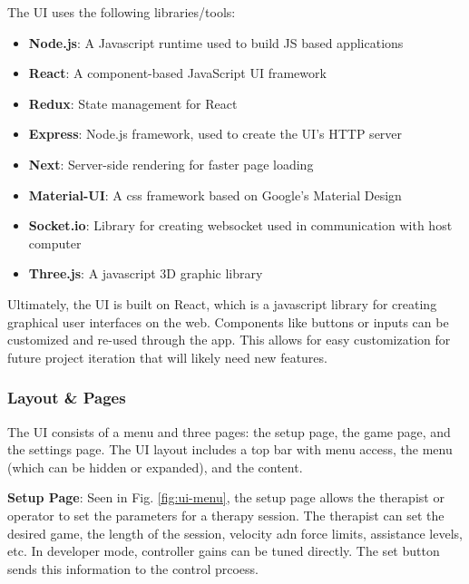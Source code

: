 \documentclass[12pt]{report}
\begin{document}
	The UI uses the following libraries/tools:
	
	\begin{itemize}
		\item \textbf{Node.js}: A Javascript runtime used to build JS based applications 		
		\item \textbf{React}: A component-based JavaScript UI framework
		\item \textbf{Redux}: State management for React
		\item \textbf{Express}: Node.js framework, used to create the UI's HTTP server
		\item \textbf{Next}: Server-side rendering for faster page loading
		\item \textbf{Material-UI}: A css framework based on Google's Material Design
		\item \textbf{Socket.io}: Library for creating websocket used in communication with host computer
		\item \textbf{Three.js}: A javascript 3D graphic library 
	\end{itemize}
	
	
	Ultimately, the UI is built on React, which is a javascript library for creating graphical user interfaces on the web. Components like buttons or inputs can be customized and re-used through the app. This allows for easy customization for future project iteration that will likely need new features. 
	
		\subsubsection{Layout \& Pages}

The UI consists of a menu and three pages: the setup page, the game page, and the settings page. The UI layout includes a top bar with menu access, the menu (which can be hidden or expanded), and the content. 

\textbf{Setup Page}: Seen in Fig. \ref{fig:ui-menu}, the setup page allows the therapist or operator to set the parameters for a therapy session. The therapist can set the desired game, the length of the session, velocity adn force limits, assistance levels, etc. In developer mode, controller gains can be tuned directly. The set button sends this information to the control prcoess. 
\end{document}
